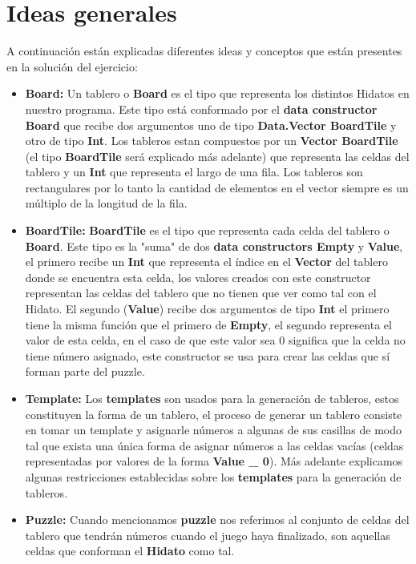 \documentclass[12pt]{article}
\begin{document}
\section{Ideas generales}
A continuaci\'on est\'an explicadas diferentes ideas y conceptos que est\'an presentes
en la soluci\'on del ejercicio:
\begin{itemize}
	\item {\bf Board:}\newline
		Un tablero o {\bf Board} es el tipo que representa los distintos Hidatos en nuestro programa. Este tipo est\'a conformado
		por el {\bf data constructor Board} que recibe dos argumentos uno de tipo {\bf Data.Vector BoardTile} y otro de tipo {\bf Int}.
		Los tableros estan compuestos por un {\bf Vector BoardTile} (el tipo {\bf BoardTile} ser\'a explicado m\'as adelante) que representa
		las celdas del tablero y un {\bf Int} que representa el largo de una fila. Los tableros son rectangulares por lo tanto la cantidad de
		elementos en el vector siempre es un m\'ultiplo de la longitud de la fila.
	\item {\bf BoardTile:}\newline
		{\bf BoardTile} es el tipo que representa cada celda del tablero o {\bf Board}. Este tipo es la "suma" de dos {\bf data constructors Empty} y {\bf Value},
		el primero recibe un {\bf Int} que representa el \'indice en el {\bf Vector} del tablero donde se encuentra esta celda, los valores creados con este constructor
		representan las celdas del tablero que no tienen que ver como tal con el Hidato. El segundo ({\bf Value}) recibe dos argumentos de tipo {\bf Int} el primero tiene
		la misma funci\'on que el primero de {\bf Empty}, el segundo representa el valor de esta celda, en el caso de que este valor sea 0 significa que la celda no tiene n\'umero
		asignado, este constructor se usa para crear las celdas que s\'i forman parte del puzzle.
	\item {\bf Template:}\newline
		Los {\bf templates} son usados para la generaci\'on de tableros, estos constituyen la forma de un tablero, el proceso de generar un tablero consiste en tomar un template y asignarle
		n\'umeros a algunas de sus casillas de modo tal que exista una \'unica forma de asignar n\'umeros a las celdas vac\'ias (celdas representadas por valores de la forma {\bf Value \_ 0}). M\'as adelante explicamos
		algunas restricciones establecidas sobre los {\bf templates} para la generaci\'on de tableros.
	\item {\bf Puzzle:}\newline
		Cuando mencionamos {\bf puzzle} nos referimos al conjunto de celdas del tablero que tendr\'an n\'umeros cuando el juego haya finalizado, son aquellas celdas que conforman el {\bf Hidato} como tal.	
\end{itemize}
\end{document}

